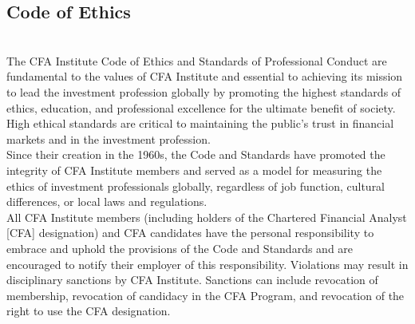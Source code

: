 \subsection{Code of Ethics}

\begin{remark} \\
The CFA Institute Code of Ethics and Standards of Professional Conduct are fundamental to the values of CFA Institute and essential to achieving its mission to lead the investment profession globally by promoting the highest standards of ethics, education, and professional excellence for the ultimate benefit of society. High ethical standards are critical to maintaining the public’s trust in financial markets and in the investment profession.\\
Since their creation in the 1960s, the Code and Standards have promoted the integrity of CFA Institute members and served as a model for measuring the ethics of investment professionals globally, regardless of job function, cultural differences, or local laws and regulations.\\
All CFA Institute members (including holders of the Chartered Financial Analyst [CFA] designation) and CFA candidates have the personal responsibility to embrace and uphold the provisions of the Code and Standards and are encouraged to notify their employer of this responsibility. Violations may result in disciplinary sanctions by CFA Institute. Sanctions can include revocation of membership, revocation of candidacy in the CFA Program, and revocation of the right to use the CFA designation.
\end{remark}

